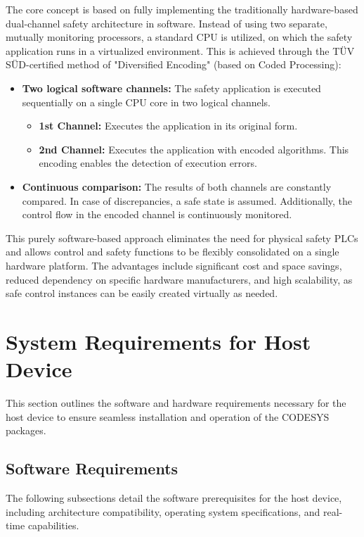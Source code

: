\documentclass[a4paper,12pt]{article}
\begin{document}
The core concept is based on fully implementing the traditionally hardware-based dual-channel safety architecture in software. Instead of using two separate, mutually monitoring processors, a standard CPU is utilized, on which the safety application runs in a virtualized environment. This is achieved through the TÜV SÜD-certified method of "Diversified Encoding" (based on Coded Processing):

\begin{itemize}
	\item \textbf{Two logical software channels:} The safety application is executed sequentially on a single CPU core in two logical channels.
	\begin{itemize}
		\item \textbf{1st Channel:} Executes the application in its original form.
		\item \textbf{2nd Channel:} Executes the application with encoded algorithms. This encoding enables the detection of execution errors.
	\end{itemize}
	\item \textbf{Continuous comparison:} The results of both channels are constantly compared. In case of discrepancies, a safe state is assumed. Additionally, the control flow in the encoded channel is continuously monitored.
\end{itemize}

This purely software-based approach eliminates the need for physical safety PLCs and allows control and safety functions to be flexibly consolidated on a single hardware platform. The advantages include significant cost and space savings, reduced dependency on specific hardware manufacturers, and high scalability, as safe control instances can be easily created virtually as needed.

\section{System Requirements for Host Device}
This section outlines the software and hardware requirements necessary for the host device to ensure seamless installation and operation of the CODESYS packages.



\subsection{Software Requirements}
The following subsections detail the software prerequisites for the host device, including architecture compatibility, operating system specifications, and real-time capabilities.
\end{document}
